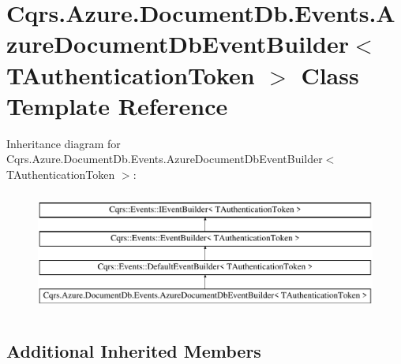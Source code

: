 \hypertarget{classCqrs_1_1Azure_1_1DocumentDb_1_1Events_1_1AzureDocumentDbEventBuilder}{}\section{Cqrs.\+Azure.\+Document\+Db.\+Events.\+Azure\+Document\+Db\+Event\+Builder$<$ T\+Authentication\+Token $>$ Class Template Reference}
\label{classCqrs_1_1Azure_1_1DocumentDb_1_1Events_1_1AzureDocumentDbEventBuilder}
Inheritance diagram for Cqrs.\+Azure.\+Document\+Db.\+Events.\+Azure\+Document\+Db\+Event\+Builder$<$ T\+Authentication\+Token $>$\+:\begin{figure}[H]
\begin{center}
\leavevmode
\includegraphics[height=4.000000cm]{classCqrs_1_1Azure_1_1DocumentDb_1_1Events_1_1AzureDocumentDbEventBuilder}
\end{center}
\end{figure}
\subsection*{Additional Inherited Members}
